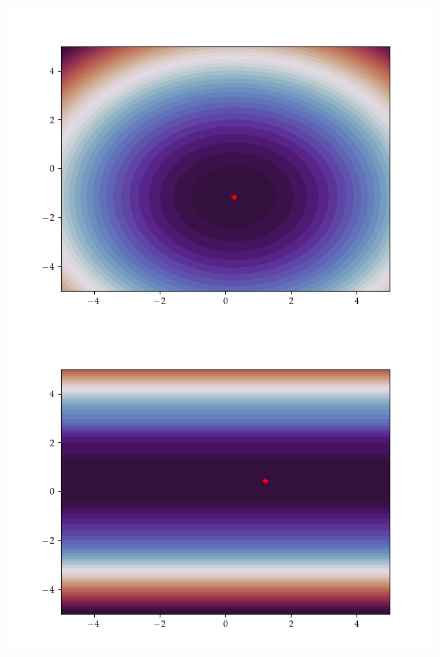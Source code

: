 \begin{figure}[h]
    \centering
    \begin{minipage}[b]{0.32\textwidth}
     \includegraphics[trim=2.5cm 1.3cm 2.5cm 1.3cm,clip,width=\textwidth]{Figures/coco/f1.png}
    \end{minipage}
    \hfill
    \begin{minipage}[b]{0.32\textwidth}
     \includegraphics[trim=2.5cm 1.3cm 2.5cm 1.3cm,clip,width=\textwidth]{Figures/coco/f2.png}
    \end{minipage}
    \hfill
    \begin{minipage}[b]{0.32\textwidth}

\end{minipage}
\end{figure}

